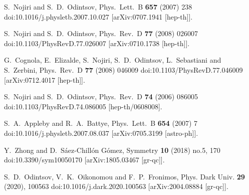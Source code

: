 \documentclass[aps,prd,twocolumn,groupedaddress,showpacs,nofootinbib,amssymb]{revtex4-2}
\begin{document}
\begin{thebibliography}{99}
S.~Nojiri and S.~D.~Odintsov,
Phys.\ Lett.\ B {\bf 657} (2007) 238
doi:10.1016/j.physletb.2007.10.027 [arXiv:0707.1941 [hep-th]].

S.~Nojiri and S.~D.~Odintsov,
Phys.\ Rev.\ D {\bf 77} (2008) 026007
doi:10.1103/PhysRevD.77.026007 [arXiv:0710.1738 [hep-th]].

G.~Cognola, E.~Elizalde, S.~Nojiri, S.~D.~Odintsov, L.~Sebastiani
and S.~Zerbini,
Phys.\ Rev.\ D {\bf 77} (2008) 046009
doi:10.1103/PhysRevD.77.046009 [arXiv:0712.4017 [hep-th]].

S.~Nojiri and S.~D.~Odintsov,
Phys.\ Rev.\ D {\bf 74} (2006) 086005
doi:10.1103/PhysRevD.74.086005 [hep-th/0608008].

S.~A.~Appleby and R.~A.~Battye,
Phys.\ Lett.\ B {\bf 654} (2007) 7
doi:10.1016/j.physletb.2007.08.037 [arXiv:0705.3199 [astro-ph]].



Y.~Zhong and D.~S\'aez-Chill\'on G\'omez,
Symmetry \textbf{10} (2018) no.5, 170
doi:10.3390/sym10050170
[arXiv:1805.03467 [gr-qc]].

S.~D.~Odintsov, V.~K.~Oikonomou and F.~P.~Fronimos,
Phys. Dark Univ. \textbf{29} (2020), 100563
doi:10.1016/j.dark.2020.100563
[arXiv:2004.08884 [gr-qc]].




\end{thebibliography}
\end{document}
